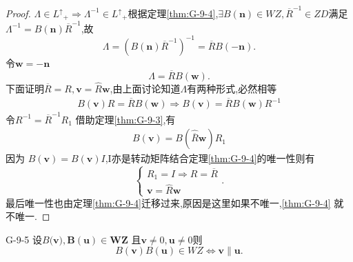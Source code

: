\documentclass[../main.tex]{subfiles}
\begin{document}
\begin{proof}
	$\Lambda \in L^{\uparrow}{}_{+} \Rightarrow \Lambda^{-1} \in  L^{\uparrow}{}_{+} $根据定理\ref{thm:G-9-4},$\exists B(\bm{n}) \in  WZ , \overline{R}^{-1}\in ZD$满足$\Lambda^{-1}= B(\bm{n})\overline{R}^{-1}$,故\[
		\Lambda = (B(\bm{n})\overline{R}^{-1})^{-1} = \overline{R}B(-\bm{n})
		.\]
	令$\bm{w} = -\bm{n}$
	\[
		\Lambda = \overline{R}B(\bm{w})
		.\]
	下面证明$\overline{R} = R , \bm{v} = \hat{R}\bm{w} $,由上面讨论知道$\Lambda$有两种形式,必然相等
	\begin{align*}
		B(\bm{v}) R = \overline{R}B(\bm{w}) \Rightarrow B(\bm{v}) = \overline{R}B(\bm{w})R^{-1}
	\end{align*}
	令$R^{-1} = \overline{R}^{-1} R_1$
	借助定理\ref{thm:G-9-3},有
	\begin{align*}
		B(\bm{v}) =  B(\hat{\overline{R}}\bm{w} ) R_1
	\end{align*}
	因为 $B(\bm{v}) = B(\bm{v} )I $,I亦是转动矩阵结合定理\ref{thm:G-9-4}的唯一性则有
	\[\begin{cases}
			R_1 = I \Rightarrow R = \overline{R} \\
			\bm{v} =  \hat{R}\bm{w}
		\end{cases}.\]最后唯一性也由定理\ref{thm:G-9-4}迁移过来,原因是这里如果不唯一,\ref{thm:G-9-4}
	就不唯一.
\end{proof}
\begin{theorem}{}{G-9-5}
	设$B(\bm{v), B(\bm{u} )\in WZ} $ 且$\bm{v} \neq 0,\bm{u}\neq 0  $则\[
		B(\bm{v})B(\bm{u} )\in WZ \Leftrightarrow \bm{v}  \parallel \bm{u}
		.\]
\end{theorem}
\end{document}
